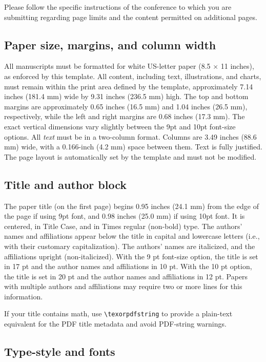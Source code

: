 \documentclass[9pt]{ieeeconf}
\begin{document}
Please follow the specific instructions of the conference to which you are submitting regarding page limits and the content permitted on additional pages.


\subsection{Paper size, margins, and column width}
\label{sec:sizes}

All manuscripts must be formatted for white US-letter paper (8.5 $\times$ 11 inches), as enforced by this template. All content, including text, illustrations, and charts, must remain within the print area defined by the template, approximately 7.14 inches (181.4 mm) wide by 9.31 inches (236.5 mm) high. The top and bottom margins are approximately 0.65 inches (16.5 mm) and 1.04 inches (26.5 mm), respectively, while the left and right margins are 0.68 inches (17.3 mm). The exact vertical dimensions vary slightly between the 9pt and 10pt font-size options. All {\it text} must be in a two-column format. Columns are 3.49 inches (88.6 mm) wide, with a 0.166-inch (4.2 mm) space between them. Text is fully justified. The page layout is automatically set by the template and must not be modified.

\subsection{Title and author block}
\label{sec:titleauthor}

The paper title (on the first page) begins 0.95 inches (24.1 mm) from the edge of the page if using 9pt font, and 0.98 inches (25.0 mm) if using 10pt font. It is centered, in Title Case, and in Times regular (non-bold) type. The authors' names and affiliations appear below the title in capital and lowercase letters (i.e., with their customary capitalization). The authors' names are italicized, and the affiliations upright (non-italicized). With the 9 pt font-size option, the title is set in 17 pt and the author names and affiliations in 10 pt. With the 10 pt option, the title is set in 20 pt and the author names and affiliations in 12 pt.
Papers with multiple authors and affiliations may require two or more lines for this information.

If your title contains math, use \verb|\texorpdfstring| to provide a plain-text equivalent for the PDF title metadata and avoid PDF-string warnings.

\subsection{Type-style and fonts}
\label{sec:typestyle}
\end{document}
